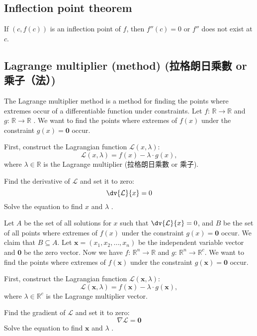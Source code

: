 \documentclass[a4paper,12pt]{report}
\begin{document}
\subsection{Inflection point theorem}
If $(c,f(c))$ is an inflection point of $f$, then $f''(c)=0$ or $f''$ does not exist at $c$.
\subsection{Lagrange multiplier (method) (拉格朗日乘數 or 乘子（法）)}
The Lagrange multiplier method is a method for finding the points where extremes occur of a differentiable function under constraints.
Let $f:\,\mathbb{R} \rightarrow \mathbb{R}$ and $g:\,\mathbb{R} \rightarrow \mathbb{R}$ . We want to find the points where extremes of \( f(x) \) under the constraint \( g(x) = \mathbf{0} \) occur. 

First, construct the Lagrangian function \( \mathcal{L}(x,\lambda) \):
\[\mathcal{L}(x,\lambda) = f(x) - \lambda \cdot g(x),\]
where \( \lambda\in\mathbb{R} \) is the Lagrange multiplier (拉格朗日乘數 or 乘子).

Find the derivative of $\mathcal{L}$ and set it to zero:
\[
\dv{\mathcal{L}}{x} = 0
\]
Solve the equation to find \( x \) and \( \lambda \) . 

 Let $A$ be the set of all solutions for \( x \) such that $\dv{\mathcal{L}}{x} = 0$, and $B$ be the set of all points where extremes of \( f(x) \) under the constraint \( g(x) = \mathbf{0} \) occur. We claim that $B\subseteq A$.
Let \( \mathbf{x} = (x_1, x_2, \dots, x_n) \) be the independent variable vector and $\mathbf{0}$ be the zero vector. Now we have $f:\,\mathbb{R}^n \rightarrow \mathbb{R}$ and $g:\,\mathbb{R}^n \rightarrow \mathbb{R}^c$. We want to find the points where extremes of \( f(\mathbf{x}) \) under the constraint \( g(\mathbf{x}) = \mathbf{0}\) occur. 

First, construct the Lagrangian function \( \mathcal{L}(\mathbf{x},\lambda) \):
\[
\mathcal{L}(\mathbf{x},\lambda) = f(\mathbf{x}) - \lambda \cdot g(\mathbf{x}),
\]
where \( \lambda\in\mathbb{R}^c \) is the Lagrange multiplier vector.

Find the gradient of $\mathcal{L}$ and set it to zero:
\[
\nabla \mathcal{L} = \mathbf{0}
\]
Solve the equation to find \( \mathbf{x} \) and \( \lambda \) . 
\end{document}
